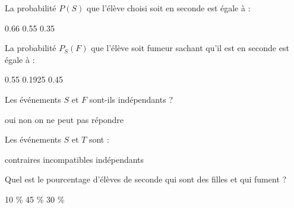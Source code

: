 \begin{questions}
	\question[1] La probabilité $P(S)$ que l'élève choisi soit en seconde est égale à :
	
		\begin{oneparcheckboxes}
			\choice \num{0.66}
			\choice \num{0.55}
			\correctchoice \num{0.35}
		\end{oneparcheckboxes}
	
		
	\question[1] La probabilité $P_S(F)$ que l'élève soit fumeur sachant qu'il est en seconde est égale à :
	
	\begin{oneparcheckboxes}
		
		\correctchoice \num{0.55}
		\choice \num{0.1925}
		\choice \num{0.45}
	\end{oneparcheckboxes}	


	\question[1] Les événements $S$ et $F$ sont-ils indépendants ?
	
	\begin{oneparcheckboxes}
		
		\correctchoice oui
		\choice non
		\choice on ne peut pas répondre
	\end{oneparcheckboxes}

	\question[1] Les événements $S$ et $T$ sont :
	
	\begin{oneparcheckboxes}
		
		
		\choice contraires
		\correctchoice incompatibles
		\choice indépendants
	\end{oneparcheckboxes}

	\question[1] Quel est le pourcentage d'élèves de seconde qui sont des filles et qui fument ?
	
	\begin{oneparcheckboxes}
		
		\choice \num{10} \%
		\choice \num{45} \%
		\correctchoice \num{30} \%
	\end{oneparcheckboxes}	
\end{questions}